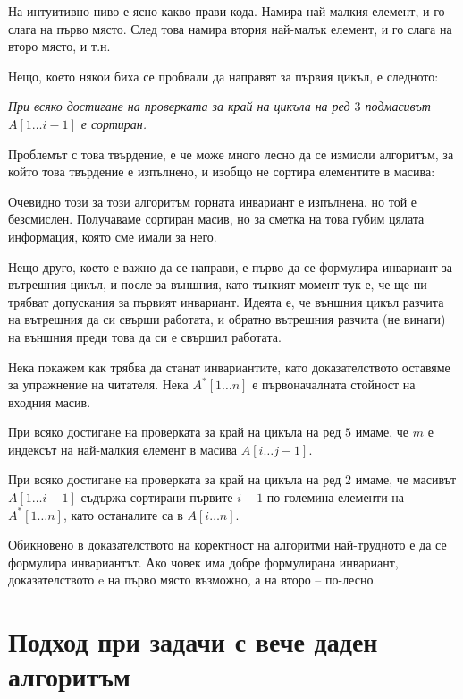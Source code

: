 На интуитивно ниво е ясно какво прави кода.
Намира най-малкия елемент, и го слага на първо място.
След това намира втория най-малък елемент, и го слага на второ място, и т.н.

Нещо, което някои биха се пробвали да направят за първия цикъл, е следното:
\begin{center}
    \textit{При всяко достигане на проверката за край на цикъла на ред $3$ подмасивът $A[1 \dots i - 1]$ е сортиран.}
\end{center}

Проблемът с това твърдение, е че може много лесно да се измисли алгоритъм, за който това твърдение е изпълнено, и изобщо не сортира елементите в масива:


Очевидно този за този алгоритъм горната инвариант е изпълнена, но той е безсмислен.
Получаваме сортиран масив, но за сметка на това губим цялата информация, която сме имали за него.

Нещо друго, което е важно да се направи, е първо да се формулира инвариант за вътрешния цикъл, и после за външния, като тънкият момент тук е, че ще ни трябват допускания за първият инвариант.
Идеята е, че външния цикъл разчита на вътрешния да си свърши работата, и обратно вътрешния разчита (не винаги) на външния преди това да си е свършил работата.

Нека покажем как трябва да станат инвариантите, като доказателството оставяме за упражнение на читателя.
Нека $A^*[1 \dots n]$ е първоначалната стойност на входния масив.
\begin{invariant}
    При всяко достигане на проверката за край на цикъла на ред $5$ имаме, че $m$ е индексът на най-малкия елемент в масива $A[i \dots j - 1]$.
\end{invariant}

\begin{invariant}
    При всяко достигане на проверката за край на цикъла на ред $2$ имаме, че масивът $A[1 \dots i - 1]$ съдържа сортирани първите $i - 1$ по големина елементи на $A^*[1 \dots n]$, като останалите са в $A[i \dots n]$.
\end{invariant}

Обикновено в доказателството на коректност на алгоритми най-трудното е да се формулира инвариантът.
Ако човек има добре формулирана инвариант, доказателството e на първо място възможно, а на второ -- по-лесно.

\section{Подход при задачи с вече даден алгоритъм}


